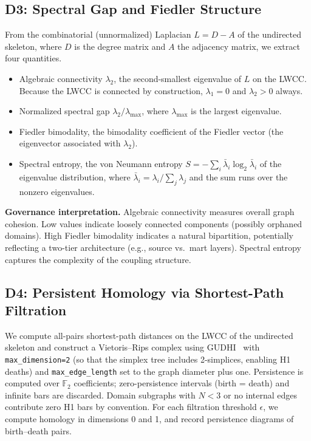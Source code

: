 \documentclass[11pt,a4paper]{article}
\begin{document}
\subsection{D3: Spectral Gap and Fiedler Structure}

From the combinatorial (unnormalized) Laplacian $L = D - A$ of the
undirected skeleton, where $D$ is the degree matrix and $A$ the
adjacency matrix, we extract four quantities.

\begin{itemize}
  \item Algebraic connectivity $\lambda_2$, the second-smallest
        eigenvalue of $L$ on the LWCC. Because the LWCC is connected by
        construction, $\lambda_1 = 0$ and $\lambda_2 > 0$ always.
  \item Normalized spectral gap $\lambda_2 / \lambda_{\max}$, where
        $\lambda_{\max}$ is the largest eigenvalue.
  \item Fiedler bimodality, the bimodality coefficient of the Fiedler vector
        (the eigenvector associated with $\lambda_2$).
  \item Spectral entropy, the von Neumann entropy
        $S = -\sum_i \bar{\lambda}_i \log_2 \bar{\lambda}_i$ of the
        eigenvalue distribution, where
        $\bar{\lambda}_i = \lambda_i / \sum_j \lambda_j$ and the sum runs
        over the nonzero eigenvalues.
\end{itemize}

\textbf{Governance interpretation.} Algebraic connectivity measures
overall graph cohesion. Low values indicate loosely connected components
(possibly orphaned domains). High Fiedler bimodality indicates a natural
bipartition, potentially reflecting a two-tier architecture (e.g.,
source vs.\ mart layers). Spectral entropy captures the complexity of
the coupling structure.

\subsection{D4: Persistent Homology via Shortest-Path Filtration}

We compute all-pairs shortest-path distances on the LWCC of the
undirected skeleton and construct a Vietoris--Rips complex using
GUDHI~\citep{otter2017} with \texttt{max\_dimension=2} (so that the
simplex tree includes 2-simplices, enabling H1 deaths) and
\texttt{max\_edge\_length} set to the graph diameter plus one. Persistence
is computed over $\mathbb{F}_2$ coefficients; zero-persistence intervals
(birth = death) and infinite bars are discarded. Domain subgraphs with
$N < 3$ or no internal edges contribute zero H1 bars by convention.
For each filtration threshold $\epsilon$, we compute homology in
dimensions 0 and 1, and record persistence diagrams of birth--death pairs.
\end{document}
